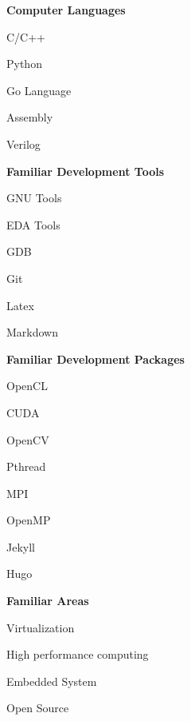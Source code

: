 \documentclass[a4paper,12pt,final]{memoir}
\newcommand{\Sep}{\vspace{1.5em}}
\newcommand{\SmallSep}{\vspace{0.5em}}
\newcommand{\CVSection}[1]
	{\Large\textbf{#1}\par
	\SmallSep\normalsize\normalfont}
\newcommand{\CVItem}[1]
	{\textbf{\color{RoyalBlue} #1}}
\begin{document}
\CVItem{Computer Languages}
\begin{multicols}{3}
\begin{compactitem}[\color{RoyalBlue}$\circ$]
	\item C/C++ 
	\item Python 
	\item Go Language
	\item Assembly
	\item Verilog
\end{compactitem}
\end{multicols}
\SmallSep
\CVItem{Familiar Development Tools}
\begin{multicols}{3}
\begin{compactitem}[\color{RoyalBlue}$\circ$]
	\item GNU Tools
	\item EDA Tools
	\item GDB
	\item Git
	\item Latex
	\item Markdown
\end{compactitem}
\end{multicols}
\CVItem{Familiar Development Packages}
\begin{multicols}{3}
\begin{compactitem}[\color{RoyalBlue}$\circ$]
	\item OpenCL
	\item CUDA
	\item OpenCV
	\item Pthread
	\item MPI
	\item OpenMP
	\item Jekyll
	\item Hugo
\end{compactitem}
\end{multicols}
\CVItem{Familiar Areas}
\begin{multicols}{3}
\begin{compactitem}[\color{RoyalBlue}$\circ$]
	\item Virtualization
	\item High performance computing
	\item Embedded System
	\item Open Source
\end{compactitem}
\end{multicols}
\Sep 
\end{document}
